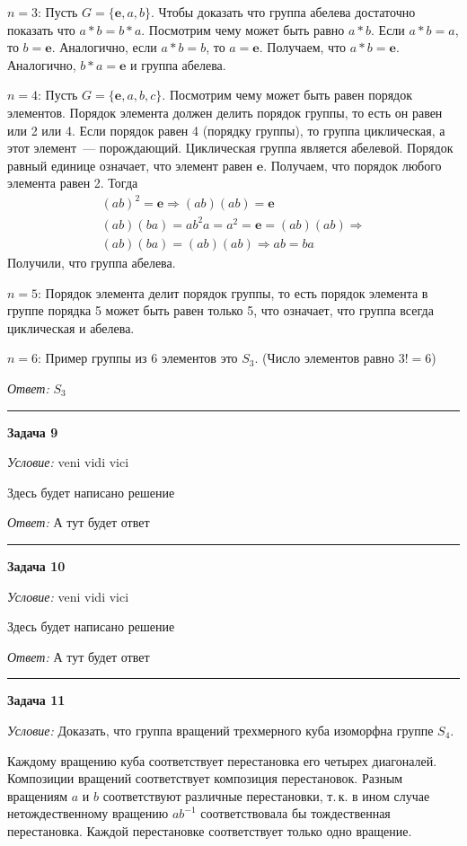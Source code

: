 \documentclass[12pt,a4paper]{article}
\newcommand{\sbs}{\large \bfseries}
\newcommand{\rl}{\vspace{16pt} \hrule \vspace{8pt}}
\begin{document}
$n=3$: Пусть $G = \{\boldsymbol{e}, a ,b\}$. Чтобы доказать что группа абелева достаточно показать что $a * b = b * a$. Посмотрим чему может быть равно $a*b$. Если $a*b=a$, то $b=\boldsymbol{e}$. Аналогично, если $a*b=b$, то $a=\boldsymbol{e}$. Получаем, что $a*b=\boldsymbol{e}$. Аналогично, $b*a=\boldsymbol{e}$ и группа абелева.

$n=4$: Пусть $G = \{\boldsymbol{e}, a, b, c\}$. Посмотрим чему может быть равен порядок элементов. Порядок элемента должен делить порядок группы, то есть он равен или 2 или 4. Если порядок равен 4 (порядку группы), то группа циклическая, а этот элемент~--- порождающий. Циклическая группа является абелевой. Порядок равный единице означает, что элемент равен $\boldsymbol{e}$. Получаем, что порядок любого элемента равен 2. Тогда
\begin{gather*}
(ab)^2=\boldsymbol{e} \Rightarrow (ab)(ab)=\boldsymbol{e} \\
(ab)(ba)=ab^2a=a^2=\boldsymbol{e}=(ab)(ab)\Rightarrow \\
(ab)(ba)=(ab)(ab)\Rightarrow ab=ba
\end{gather*}
Получили, что группа абелева.

$n=5$: Порядок элемента делит порядок группы, то есть порядок элемента в группе порядка 5 может быть равен только 5, что означает, что группа всегда циклическая и абелева.

$n=6$: Пример группы из 6 элементов это $S_3$. (Число элементов равно $3!=6$)

{\itshape Ответ: } $S_3$




\rl
{\sbs Задача 9}

{\itshape Условие: } veni vidi vici

Здесь будет написано решение

{\itshape Ответ: } А тут будет ответ




\rl
{\sbs Задача 10}

{\itshape Условие: } veni vidi vici

Здесь будет написано решение

{\itshape Ответ: } А тут будет ответ




\rl
{\sbs Задача 11}

{\itshape Условие: } Доказать, что группа вращений трехмерного куба изоморфна группе $S_4$.

Каждому вращению куба соответствует перестановка его четырех диагоналей. Композиции вращений соответствует композиция перестановок. Разным вращениям  $a$ и $b$ соответствуют различные перестановки, т.\,к. в ином случае нетождественному вращению  $ab^{-1}$ соответствовала бы тождественная перестановка. Каждой перестановке соответствует только одно вращение.
\end{document}
